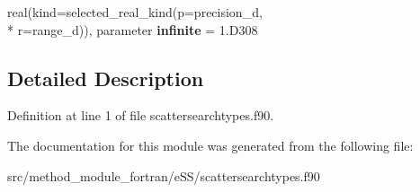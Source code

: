 \begin{DoxyCompactItemize}
\item 
\hypertarget{classscattersearchtypes_adbc1a67cc8ccbaacc2c8ba172a28371d}{real(kind=selected\-\_\-real\-\_\-kind(p=precision\-\_\-d, \\*
r=range\-\_\-d)), parameter {\bfseries infinite} = 1.\-D308}\label{classscattersearchtypes_adbc1a67cc8ccbaacc2c8ba172a28371d}

\end{DoxyCompactItemize}


\subsection{Detailed Description}


Definition at line 1 of file scattersearchtypes.\-f90.



The documentation for this module was generated from the following file\-:\begin{DoxyCompactItemize}
\item 
src/method\-\_\-module\-\_\-fortran/e\-S\-S/scattersearchtypes.\-f90\end{DoxyCompactItemize}
